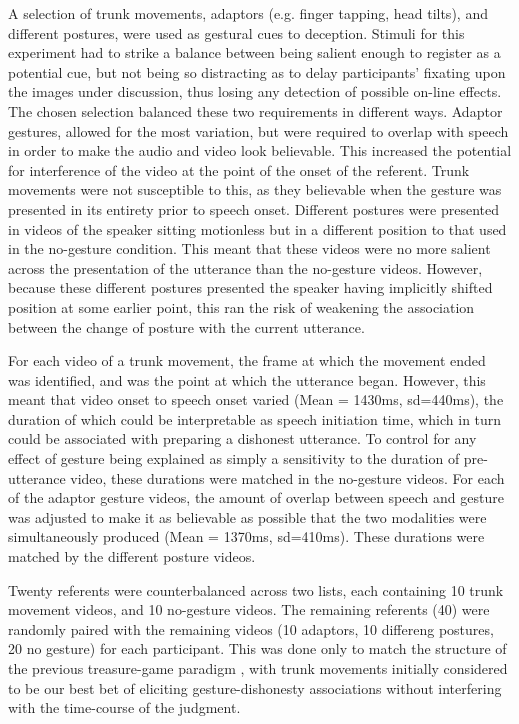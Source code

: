 \documentclass[a4paper,man,natbib]{apa6}
\begin{document}
A selection of trunk movements, adaptors (e.g. finger tapping, head tilts), and different postures, were used as gestural cues to deception.
Stimuli for this experiment had to strike a balance between being salient enough to register as a potential cue, but not being so distracting as to delay participants' fixating upon the images under discussion, thus losing any detection of possible on-line effects. 
The chosen selection balanced these two requirements in different ways.
Adaptor gestures, allowed for the most variation, but were required to overlap with speech in order to make the audio and video look believable.
This increased the potential for interference of the video at the point of the onset of the referent.
Trunk movements were not susceptible to this, as they believable when the gesture was presented in its entirety prior to speech onset. 
Different postures were presented in videos of the speaker sitting motionless but in a different position to that used in the no-gesture condition.
This meant that these videos were no more salient across the presentation of the utterance than the no-gesture videos.
However, because these different postures presented the speaker having implicitly shifted position at some earlier point, this ran the risk of weakening the association between the change of posture with the current utterance.

For each video of a trunk movement, the frame at which the movement ended was identified, and was the point at which the utterance began.
However, this meant that video onset to speech onset varied (Mean = 1430ms, sd=440ms), the duration of which could be interpretable as speech initiation time, which in turn could be associated with preparing a dishonest utterance.
To control for any effect of gesture being explained as simply a sensitivity to the duration of pre-utterance video, these durations were matched in the no-gesture videos.
For each of the adaptor gesture videos, the amount of overlap between speech and gesture was adjusted to make it as believable as possible that the two modalities were simultaneously produced (Mean = 1370ms, sd=410ms).
These durations were matched by the different posture videos.

Twenty referents were counterbalanced across two lists, each containing 10 trunk movement videos, and 10 no-gesture videos. 
The remaining referents (40) were randomly paired with the remaining videos (10 adaptors, 10 differeng postures, 20 no gesture) for each participant.
This was done only to match the structure of the previous treasure-game paradigm \citep{Loy2017}, with trunk movements initially considered to be our best bet of eliciting gesture-dishonesty associations without interfering with the time-course of the judgment. 
\end{document}
